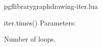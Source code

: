 \begin{filedescription}{pgflibrarygraphdrawing-iter.lua}
\begin{luacommand}{{iter.times}()}
Parameters:
\begin{parameterdescription}
	\item[\meta{n}] Number of loops. 
\end{parameterdescription}



\end{luacommand}

\end{filedescription}